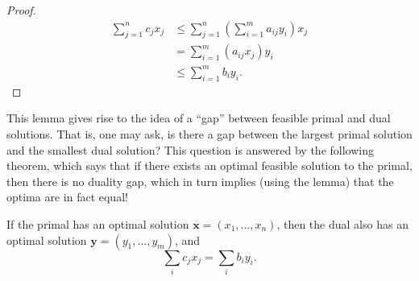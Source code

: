 \documentclass[11pt]{article}
\newenvironment{theorem}[2][Theorem]{\begin{trivlist}
\item[\hskip \labelsep {\bfseries #1}\hskip \labelsep {\bfseries #2.}]}{\end{trivlist}}
\begin{document}
\begin{proof}{}
	\begin{align*}
		\sum_{j=1}^{n} c_j x_j &\leq \sum_{j=1}^{n} \left( \sum_{i=1}^{m} a_{ij} y_i
		\right) x_j \\
		&= \sum_{i=1}^{m} \left( a_{ij} x_j \right) y_i \\
		&\leq \sum_{i=1}^{m} b_i y_i.
	\end{align*}
\end{proof}

This lemma gives rise to the idea of a ``gap'' between feasible primal and dual solutions. 
That is, one may ask, is there a gap between the largest primal solution and the smallest 
dual solution? This question is answered by the following theorem, which says that if there 
exists an optimal feasible solution to the primal, then there is no duality gap, which in 
turn implies (using the lemma) that the optima are in fact equal!

\begin{theorem}{(Strong duality)}
	If the primal has an optimal solution $\mathbf{x} = (x_1,...,x_n)$, then the dual 
	also has an optimal solution $\mathbf{y} = (y_1,...,y_m)$, and 
	\[
		\sum_i c_j x_j = \sum_i b_i y_i.
	\]
\end{theorem}
\end{document}
